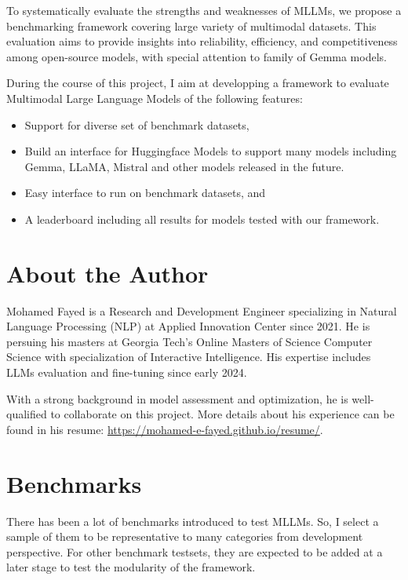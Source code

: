 \documentclass[
	letterpaper, %
]{jdf}
\begin{document}
To systematically evaluate the strengths and weaknesses of MLLMs, we propose a benchmarking framework covering large variety of multimodal datasets.
This evaluation aims to provide insights into reliability, efficiency, and competitiveness among open-source models, with special attention to family of Gemma models.

During the course of this project, I aim at developping a framework to evaluate Multimodal Large Language Models of the following features:
     \begin{itemize}
              \item Support for diverse set of benchmark datasets,
              \item Build an interface for Huggingface Models to support many models including Gemma, LLaMA, Mistral and other models released in the future.
              \item Easy interface to run on benchmark datasets, and
              \item A leaderboard including all results for models tested with our framework.
                   \end{itemize}

\section{About the Author}\label{sect:about-me}
Mohamed Fayed is a Research and Development Engineer specializing in Natural Language Processing (NLP) at Applied Innovation Center since 2021.
He is persuing his masters at Georgia Tech's Online Masters of Science Computer Science with specialization of Interactive Intelligence.
His expertise includes LLMs evaluation and fine-tuning since early 2024.

With a strong background in model assessment and optimization, he is well-qualified to collaborate on this project.
More details about his experience can be found in his resume: \href{https://mohamed-e-fayed.github.io/resume/}{https://mohamed-e-fayed.github.io/resume/}.

\section{Benchmarks}\label{sect:benchmarks}
There has been a lot of benchmarks introduced to test MLLMs.
So, I select a sample of them to be representative to many categories from development perspective.
For other benchmark testsets, they are expected to be added at a later stage to test the modularity of the framework.
\end{document}

